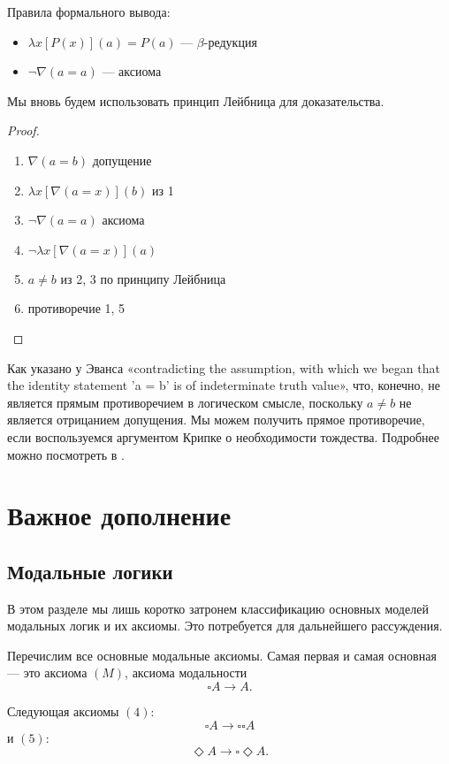 \documentclass[openany]{book}
\theoremstyle{plain}
\theoremstyle{definition}
\begin{document}
Правила формального вывода:
\begin{itemize}
    \item \(\lambda x [P(x)](a) = P(a)\) — \(\beta\)-редукция
    \item \(\neg \nabla (a = a)\) — аксиома
\end{itemize}

Мы вновь будем использовать принцип Лейбница для доказательства.

\begin{proof}
    \begin{enumerate}
	\item \(\nabla (a = b)\) допущение
	\item \(\lambda x [\nabla(a = x)](b)\) из 1
	\item \(\neg \nabla(a = a)\) аксиома
	\item \(\neg \lambda x [\nabla(a = x)](a)\)
	\item \(a \not= b\) из 2, 3 по принципу Лейбница
	\item противоречие 1, 5
    \end{enumerate}
\end{proof}

Как указано у Эванса «contradicting the assumption, with which we began that the identity statement 'a = b' is of indeterminate truth value», что, конечно, не является прямым противоречием в логическом смысле, поскольку \(a \not= b\) не является отрицанием допущения. Мы можем получить прямое противоречие, если воспользуемся аргументом Крипке о необходимости тождества. Подробнее можно посмотреть в \cite{Evans}.

\section{Важное дополнение}
\subsection{Модальные логики}

В этом разделе мы лишь коротко затронем классификацию основных моделей модальных логик и их аксиомы. Это потребуется для дальнейшего рассуждения.

Перечислим все основные модальные аксиомы. Самая первая и самая основная --- это аксиома \((M)\), аксиома модальности \[\square A \to A.\]

Следующая аксиомы \((4)\): \[\square A \to \square \square A\] и \((5)\): \[\Diamond A \to \square \Diamond A.\]
\end{document}
